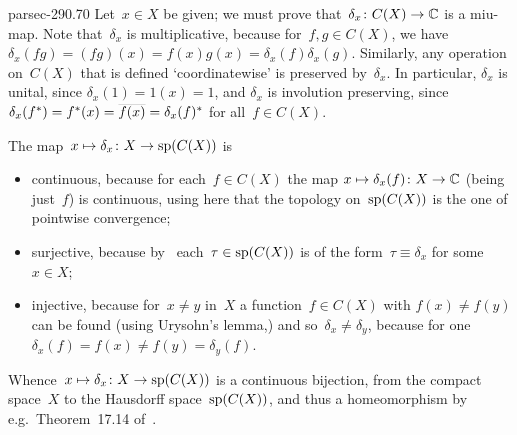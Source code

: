 \documentclass[b5page]{book}
\begin{document}
\begin{solution}{parsec-290.70}
Let~$x\in X$ be given;
  we must  prove that~$\delta_x\colon C(X)\to\mathbb{C}$ is a miu-map.
Note that~$\delta_x$ is multiplicative,
because for~$f,g\in C(X)$,
we have $\delta_x(fg)=(fg)(x)=f(x)g(x)=\delta_x(f)\delta_x(g)$.
Similarly, any operation on~$C(X)$ that is defined `coordinatewise'
is preserved by~$\delta_x$. In particular,
$\delta_x$ is unital, since $\delta_x(1)=1(x)=1$,
and $\delta_x$ is involution preserving,
since~$\delta_x(f^*)=f^*(x)=\smash{\overline{f(x)}}=\delta_x(f)^*$
for all~$f\in C(X)$.

The map~$x\mapsto \delta_x\colon X\to \mathrm{sp}(C(X))$
is 
\begin{itemize}
\item
continuous,
because for each~$f\in C(X)$
the map  $x\mapsto \delta_x(f)\colon X\to\mathbb{C}$ (being just~$f$) is continuous,
using here that the topology on~$\mathrm{sp}(C(X))$ 
is the one of pointwise convergence;
\item
surjective,
because by~
each~$\tau \in \mathrm{sp}(C(X))$
is of the form~$\tau\equiv \delta_x$
for some~$x\in X$;
\item
injective,
because for~$x\neq y$ in~$X$
a function~$f\in C(X)$ with $f(x)\neq f(y)$
    can be found (using Urysohn's lemma,)
and so~$\delta_x\neq \delta_y$,
because for one $\delta_x(f)=f(x)\neq f(y)=\delta_y(f)$.
\end{itemize}
Whence~$x\mapsto \delta_x\colon X\to \mathrm{sp}(C(X))$
is a continuous bijection,
  from the compact space~$X$
  to the Hausdorff space~$\mathrm{sp}(C(X))$,
  and thus a homeomorphism
  by e.g.~Theorem~17.14 of~\cite{willard}.
\end{solution}
\end{document}
